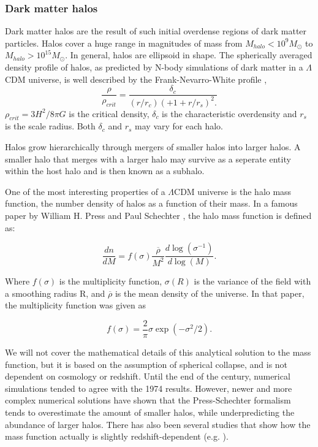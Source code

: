 \subsubsection{Dark matter halos}
Dark matter halos are the result of such initial overdense regions of dark matter particles. Halos cover a huge range in magnitudes of mass from $M_{halo} <10^9 M_{\odot}$ to $M_{halo} >10^{15} M_{\odot}$. In general, halos are ellipsoid in shape. The spherically averaged density profile of halos, as predicted by N-body simulations of dark matter in a $\Lambda$CDM universe, is well described by the Frank-Nevarro-White profile \parencite{Navarro1996},
\begin{equation}
    \frac{\rho}{\rho_{crit}} = \frac{\delta_c}{(r/r_c)(+1+r/r_s)^2.}
\end{equation}
$\rho_{crit} = 3H^2/8\pi G$ is the critical density, $\delta_c$ is the characteristic overdensity and $r_s$ is the scale radius. Both $\delta_c$ and $r_s$ may vary for each halo.

Halos grow hierarchically through mergers of smaller halos into larger halos. A smaller halo that merges with a larger halo may survive as a seperate entity within the host halo and is then known as a subhalo. 

One of the most interesting properties of a $\Lambda$CDM universe is the halo mass function, the number density of halos as a function of their mass. In a famous paper by William H. Press and Paul Schechter \parencite{Press1974}, the halo mass function is defined as:

\begin{equation}
    \frac{dn}{dM} = f(\sigma)\frac{\overline{\rho}}{M^2}\frac{d\log(\sigma^{-1})}{d\log(M)}.
\end{equation}

Where $f(\sigma)$ is the multiplicity function, $\sigma (R)$ is the variance of the field with a smoothing radius R, and $\overline{\rho}$ is the mean density of the universe. In that paper, the multiplicity function was given as

\begin{equation}
    f(\sigma) = \frac{2}{\pi} \sigma \exp(-\sigma^2/2).
\end{equation}

We will not cover the mathematical details of this analytical solution to the mass function, but it is based on the assumption of spherical collapse, and is not dependent on cosmology or redshift. Until the end of the century, numerical simulations tended to agree with the 1974 results. However, newer and more complex numerical solutions have shown that the Press-Schechter formalism tends to overestimate the amount of smaller halos, while underpredicting the abundance of larger halos. There has also been several studies that show how the mass function actually is slightly redshift-dependent (e.g. \cite{Tinker2008}).

